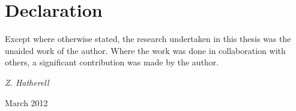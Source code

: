 \chapter*{Declaration}

\normalsize
Except where otherwise stated, the research undertaken in this thesis
was the unaided work of the author. Where the work was done in collaboration
with others, a significant contribution was made by the author.


\vspace{20mm}
\hfill {\it Z. Hatherell}

\hfill March 2012





